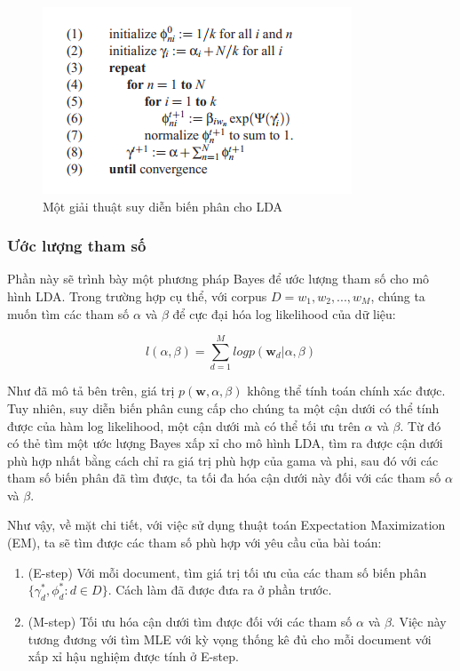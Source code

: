 \documentclass[12pt,a4paper]{article}
\begin{document}
\begin{figure}[h]
    \centering
    \includegraphics[width=.6\textwidth]{vi}
    \caption{Một giải thuật suy diễn biến phân cho LDA}
    \label{fig:vi}
\end{figure}

\subsubsection{Ước lượng tham số}
Phần này sẽ trình bày một phương pháp Bayes để ước lượng tham số cho mô hình LDA. Trong trường hợp cụ thể, với corpus $D = {w_1, w_2, ..., w_M}$, chúng ta muốn tìm các tham số $\alpha$ và $\beta$ để cực đại hóa log likelihood của dữ liệu:

\begin{equation} 
l (\alpha, \beta) = \sum_{d=1}^{M} log p (\textbf{w}_d | \alpha, \beta)
\end{equation}

\noindent
Như đã mô tả bên trên, giá trị $p(\textbf{w}, \alpha, \beta)$ không thể tính toán chính xác được. Tuy nhiên, suy diễn biến phân cung cấp cho chúng ta một cận dưới có thể tính được của hàm log likelihood, một cận dưới mà có thể tối ưu trên $\alpha$ và $\beta$. Từ đó có thẻ tìm một ước lượng Bayes xấp xỉ cho mô hình LDA, tìm ra được cận dưới phù hợp nhất bằng cách chỉ ra giá trị phù hợp của gama và phi, sau đó với các tham số biến phân đã tìm được, ta tối đa hóa cận dưới này đối với các tham số $\alpha$ và $\beta$.


Như vậy, về mặt chi tiết, với việc sử dụng thuật toán Expectation Maximization (EM), ta sẽ tìm được các tham số phù hợp với yêu cầu của bài toán:

\begin{enumerate}
\item (E-step) Với mỗi document, tìm giá trị tối ưu của các tham số biến phân $\{ \gamma_d^{*}, \phi_d^{*} : d \in D\}$. Cách làm đã được đưa ra ở phần trước.

\item (M-step) Tối ưu hóa cận dưới tìm được đối với các tham số $\alpha$ và $\beta$. Việc này tương đương với tìm MLE với kỳ vọng thống kê đủ cho mỗi document với xấp xỉ hậu nghiệm được tính ở E-step.

\end{enumerate}
\end{document}
